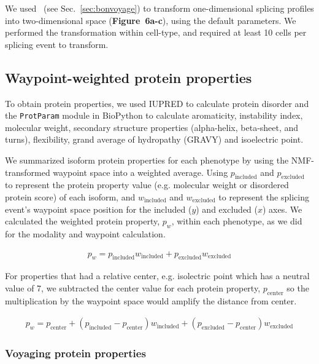 We used \bonvoyage\, (see Sec.~\ref{sec:bonvoyage}) to transform one-dimensional splicing profiles into two-dimensional space (\textbf{Figure~6a-c}), using the default parameters. We performed the transformation within cell-type, and required at least 10 cells per splicing event to transform.

\subsection{Waypoint-weighted protein properties}

To obtain protein properties, we used IUPRED\cite{Dosztanyi:2005gq} to calculate protein disorder and the \texttt{ProtParam} module in BioPython\cite{Cock:2009hj} to calculate aromaticity, instability index, molecular weight, secondary structure properties (alpha-helix, beta-sheet, and turns), flexibility, grand average of hydropathy (GRAVY) and isoelectric point.



We summarized isoform protein properties for each phenotype by using the NMF-transformed waypoint space into a weighted average. Using $p_{\text{included}}$ and $p_{\text{excluded}}$ to represent the protein property value (e.g. molecular weight or disordered protein score) of each isoform, and $w_{\text{included}}$ and $w_{\text{excluded}}$ to represent the splicing event's waypoint space position for the included ($y$) and excluded ($x$) axes. We calculated the weighted protein property, $p_w$, within each phenotype, as we did for the modality and waypoint calculation.

\begin{align}
p_w = p_{\text{included}} w_{\text{included}} + p_{\text{excluded}} w_{\text{excluded}}
\end{align}

For properties that had a relative center, e.g. isolectric point which has a neutral value of 7, we subtracted the center value for each protein property, $p_{\text{center}}$ so the multiplication by the waypoint space would amplify the distance from center.

\begin{align}
p_w = p_{\text{center}} + (p_{\text{included}} - p_{\text{center}}) w_{\text{included}} + (p_{\text{excluded}} - p_{\text{center}}) w_{\text{excluded}} 
\end{align}

\subsubsection{Voyaging protein properties}


